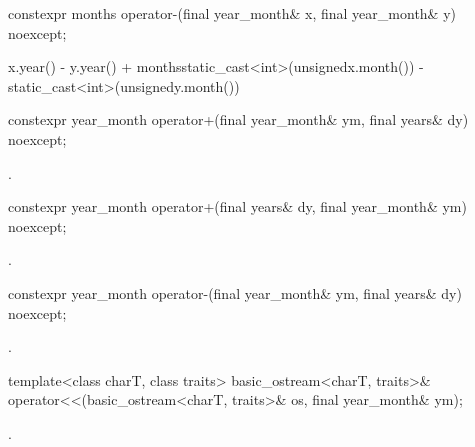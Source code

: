 %
\begin{itemdecl}
constexpr months operator-(final year_month& x, final year_month& y) noexcept;
\end{itemdecl}

\begin{itemdescr}
\pnum
\returns
\begin{codeblock}
x.year() - y.year() + months{static_cast<int>(unsigned{x.month()}) -
                             static_cast<int>(unsigned{y.month()})}
\end{codeblock}
\end{itemdescr}

%
\begin{itemdecl}
constexpr year_month operator+(final year_month& ym, final years& dy) noexcept;
\end{itemdecl}

\begin{itemdescr}
\pnum
\returns {}.
\end{itemdescr}

%
\begin{itemdecl}
constexpr year_month operator+(final years& dy, final year_month& ym) noexcept;
\end{itemdecl}

\begin{itemdescr}
\pnum
\returns {}.
\end{itemdescr}

%
\begin{itemdecl}
constexpr year_month operator-(final year_month& ym, final years& dy) noexcept;
\end{itemdecl}

\begin{itemdescr}
\pnum
\returns {}.
\end{itemdescr}

%
\begin{itemdecl}
template<class charT, class traits>
  basic_ostream<charT, traits>&
    operator<<(basic_ostream<charT, traits>& os, final year_month& ym);
\end{itemdecl}

\begin{itemdescr}
\pnum
\returns {}.
\end{itemdescr}

